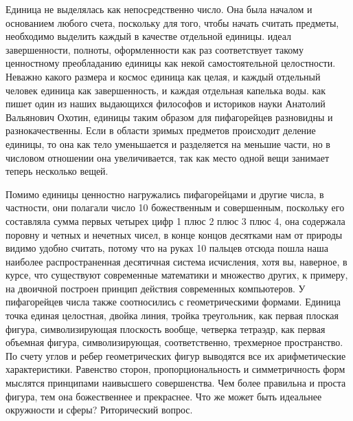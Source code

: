 Единица не выделялась как непосредственно число. Она была началом и основанием любого счета, поскольку для того, чтобы начать считать предметы, необходимо выделить каждый в
качестве отдельной единицы. идеал завершенности, полноты, оформленности как раз
соответствует такому ценностному преобладанию единицы как некой самостоятельной
целостности. Неважно какого размера и космос единица как целая, и каждый
отдельный человек единица как завершенность, и каждая отдельная капелька воды.
как пишет один из наших выдающихся философов и историков науки Анатолий
Вальянович Охотин, единицы таким образом для пифагорейцев разновидны и
разнокачественны. Если в области зримых предметов происходит деление единицы, то
она как тело уменьшается и разделяется на меньшие части, но в числовом отношении
она увеличивается, так как место одной вещи занимает теперь несколько вещей.

Помимо единицы ценностно нагружались пифагорейцами и другие числа, в частности,
они полагали число 10 божественным и совершенным, поскольку его составляла сумма
первых четырех цифр 1 плюс 2 плюс 3 плюс 4, она содержала поровну и четных и
нечетных чисел, в конце концов десятками нам от природы видимо удобно считать,
потому что на руках 10 пальцев отсюда пошла наша наиболее распространенная
десятичная система исчисления, хотя вы, наверное, в курсе, что существуют
современные математики и множество других, к примеру, на двоичной построен
принцип действия современных компьютеров. У пифагорейцев числа также
соотносились с геометрическими формами. Единица точка единая целостная, двойка
линия, тройка треугольник, как первая плоская фигура, символизирующая плоскость
вообще, четверка тетраэдр, как первая объемная фигура, символизирующая,
соответственно, трехмерное пространство. По счету углов и ребер геометрических
фигур выводятся все их арифметические характеристики. Равенство сторон,
пропорциональность и симметричность форм мыслятся принципами наивысшего
совершенства. Чем более правильна и проста фигура, тем она божественнее и
прекраснее. Что же может быть идеальнее окружности и сферы? Риторический вопрос.

